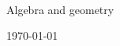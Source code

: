 \thispagestyle{empty}

~

\vspace{200pt}

\begin{center}
    {\Huge Algebra and geometry}\par
	\vspace{10pt}
    \today
\end{center}

\newpage

